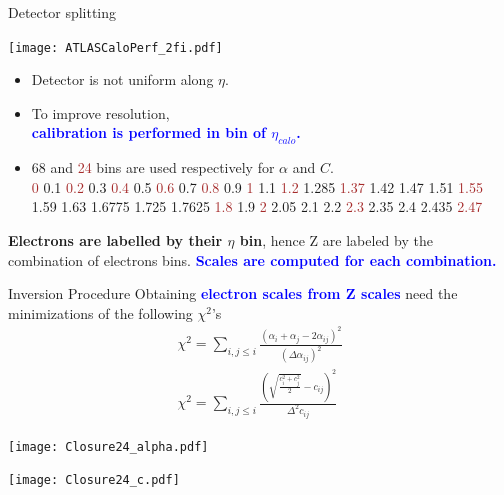 \begin{frame}{Detector splitting}
  \begin{minipage}{0.49\linewidth}
    \texttt{[image: ATLASCaloPerf\_2fi.pdf]}
  \end{minipage}
  \begin{minipage}{0.49\linewidth}
    \begin{itemize}
    \item Detector is not uniform along $\eta$.
    \item To improve resolution, \\ \textcolor{blue}{\bf calibration is performed in bin of $\eta_{calo}$.}
    \item 68 and \textcolor{brown}{24} bins are used respectively for $\alpha$ and $C$.\\
      {\tiny \textcolor{brown}{0} 0.1 \textcolor{brown}{0.2} 0.3 \textcolor{brown}{0.4} 0.5 \textcolor{brown}{0.6} 0.7 \textcolor{brown}{0.8} 0.9 \textcolor{brown}{1} 1.1 \textcolor{brown}{1.2} 1.285 \textcolor{brown}{1.37} 1.42 1.47 1.51 \textcolor{brown}{1.55} 1.59 1.63 1.6775 1.725 1.7625 \textcolor{brown}{1.8} 1.9 \textcolor{brown}{2} 2.05 2.1 2.2 \textcolor{brown}{2.3} 2.35 2.4 2.435 \textcolor{brown}{2.47}}
    \end{itemize}
  \end{minipage}
  \vfill
  {\bf Electrons are labelled by their $\eta$ bin}, hence Z are labeled by the combination of electrons bins.
  \textcolor{blue}{\bf Scales are computed for each combination.}
\end{frame}


\begin{frame}{Inversion Procedure}
Obtaining \textcolor{blue}{\bf electron scales from Z scales} need the minimizations of the following $\chi^2$'s
\begin{equation}
\begin{array}{l}
\chi^2 = \sum \limits_{i, j\leq i} \frac{ (\alpha_i + \alpha_j - 2\alpha_{ij})^2 }{(\Delta\alpha_{ij})^2}\\
\chi^2 = \sum \limits_{i, j\leq i} \frac{ (\sqrt{\frac{c_i^2 + c_j^2}{2}} - c_{ij})^2 }{\Delta^2 c_{ij}}
\end{array}
\end{equation}
\begin{center}
\begin{minipage}{0.40\linewidth}
    \texttt{[image: Closure24\_alpha.pdf]}
\end{minipage}
\begin{minipage}{0.40\linewidth}
    \texttt{[image: Closure24\_c.pdf]}
\end{minipage}
\end{center}
\end{frame}

